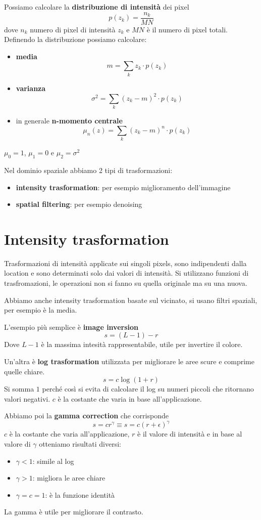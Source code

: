Possiamo calcolare la \textbf{distribuzione di intensità} dei pixel
$$p(z_k) = \frac{n_k}{MN}$$
dove $n_k$ numero di pixel di intensità $z_k$ e $MN$ è il numero di pixel totali.
Definendo la distribuzione possiamo calcolare:
\begin{itemize}
    \item \textbf{media}
    $$m = \sum_{k} z_k \cdot p(z_k)$$
    \item \textbf{varianza}
    $$\sigma^2 = \sum_{k} (z_k -m)^2 \cdot p(z_k)$$
    \item in generale \textbf{n-momento centrale}
    $$\mu_n(z) = \sum_{k} (z_k -m)^n \cdot p(z_k)$$
\end{itemize} 
\begin{nota}
    $\mu_0 = 1$, $\mu_1= 0$ e $\mu_2=\sigma^2$
\end{nota}

Nel dominio spaziale abbiamo 2 tipi di trasformazioni:
\begin{itemize}
    \item \textbf{intensity trasformation}: per esempio miglioramento dell'immagine
    \item \textbf{spatial filtering}: per esempio denoising
\end{itemize}

\section{Intensity trasformation}
Trasformazioni di intensità applicate sui singoli pixels, sono indipendenti dalla 
location e sono determinati solo dai valori di intensità. Si utilizzano funzioni 
di trasfromazioni, le operazioni non si fanno su quella originale ma su una nuova.

Abbiamo anche intensity trasformation basate sul vicinato, si usano filtri spaziali,
per esempio è la media.

L'esempio più semplice è \textbf{image inversion} 
$$s = (L-1)-r$$
Dove $L-1$ è la massima intesità rappresentabile, utile per invertire il colore.

Un'altra è \textbf{log trasformation} utilizzata per migliorare le aree scure e comprime 
quelle chiare.
$$s=c\log (1+r)$$
Si somma $1$ perché così si evita di calcolare il log su numeri piccoli che ritornano 
valori negativi. $c$ è la costante che varia in base all'applicazione.

Abbiamo poi la \textbf{gamma correction} che corrisponde 
$$s=cr^\gamma \equiv s=c(r+\epsilon)^\gamma$$
$c$ è la costante che varia all'applicazione, $r$ è il valore di intensità e in base al valore di $\gamma$ otteniamo
risultati diversi:
\begin{itemize}
    \item $\gamma < 1$: simile al log
    \item $\gamma > 1$: migliora le aree chiare
    \item $\gamma =c = 1$: è la funzione identità
\end{itemize}
La gamma è utile per migliorare il contrasto.

